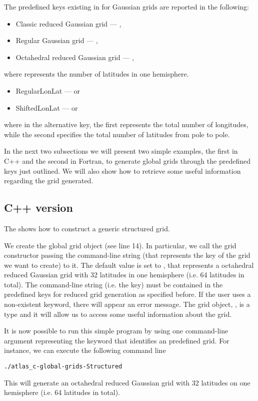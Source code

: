 The predefined keys existing in \Atlas for Gaussian grids 
are reported in the following:
%
\begin{itemize}
\item Classic reduced Gaussian grid --- ,
\item Regular Gaussian grid --- ,
\item Octahedral reduced Gaussian grid --- ,
\end{itemize}
%
where \inltc{\#} represents the number of latitudes 
in one hemisphere.
%
\begin{itemize}
\item RegularLonLat ---  or 
\item ShiftedLonLat ---  or 
\end{itemize}
%
where in the alternative key, the first \inltc{\#} represents the total number 
of longitudes, while the second \inltc{\#} specifies the total number of 
latitudes from pole to pole.

In the next two subsections we will present two simple 
examples, the first in C++ and the second in Fortran, 
to generate global grids through the predefined keys 
just outlined. We will also show how to retrieve some 
useful information regarding the grid generated.

\subsection{C++ version}
The  shows how to construct a generic
structured grid.
%

%
We create the global 
grid object (see line 14). In particular, we call the 
grid constructor passing the command-line string (that 
represents the key of the grid we want to create) to it.
The default value is set to , that represents 
a octahedral reduced Gaussian grid with 32 latitudes in one hemisphere 
(i.e. 64 latitudes in total).  
The command-line string (i.e. the key) must be contained 
in the predefined keys for reduced grid generation as specified 
before. If the user uses a non-existent keyword, there will 
appear an error message.
The grid object, , is 
a  type and it will allow 
us to access some useful information about the grid.  

It is now possible to run this simple program by using one 
command-line argument representing the keyword that identifies 
an \Atlas predefined grid. For instance, we can execute the 
following command line
%
\begin{lstlisting}[style=BashStyle]
./atlas_c-global-grids-Structured
\end{lstlisting}
% 
This will generate an octahedral reduced Gaussian grid with 
32 latitudes on one hemisphere (i.e. 64 latitudes in total).

